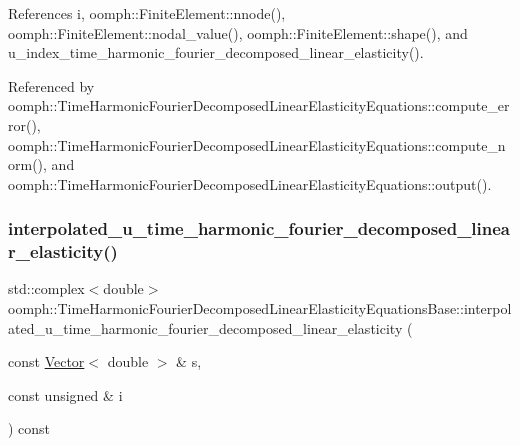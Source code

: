 References i, oomph\+::\+Finite\+Element\+::nnode(), oomph\+::\+Finite\+Element\+::nodal\+\_\+value(), oomph\+::\+Finite\+Element\+::shape(), and u\+\_\+index\+\_\+time\+\_\+harmonic\+\_\+fourier\+\_\+decomposed\+\_\+linear\+\_\+elasticity().



Referenced by oomph\+::\+Time\+Harmonic\+Fourier\+Decomposed\+Linear\+Elasticity\+Equations\+::compute\+\_\+error(), oomph\+::\+Time\+Harmonic\+Fourier\+Decomposed\+Linear\+Elasticity\+Equations\+::compute\+\_\+norm(), and oomph\+::\+Time\+Harmonic\+Fourier\+Decomposed\+Linear\+Elasticity\+Equations\+::output().

\mbox{\label{classoomph_1_1TimeHarmonicFourierDecomposedLinearElasticityEquationsBase_a0447989939b3b9a88ee060f15755c05d}} 
\subsubsection{\texorpdfstring{interpolated\+\_\+u\+\_\+time\+\_\+harmonic\+\_\+fourier\+\_\+decomposed\+\_\+linear\+\_\+elasticity()}{interpolated\_u\_time\_harmonic\_fourier\_decomposed\_linear\_elasticity()}\hspace{0.1cm}{\footnotesize\ttfamily [2/2]}}
{\footnotesize\ttfamily std\+::complex$<$double$>$ oomph\+::\+Time\+Harmonic\+Fourier\+Decomposed\+Linear\+Elasticity\+Equations\+Base\+::interpolated\+\_\+u\+\_\+time\+\_\+harmonic\+\_\+fourier\+\_\+decomposed\+\_\+linear\+\_\+elasticity (\begin{DoxyParamCaption}\item[{const \hyperlink{classoomph_1_1Vector}{Vector}$<$ double $>$ \&}]{s,  }\item[{const unsigned \&}]{i }\end{DoxyParamCaption}) const\hspace{0.3cm}{\ttfamily [inline]}}



